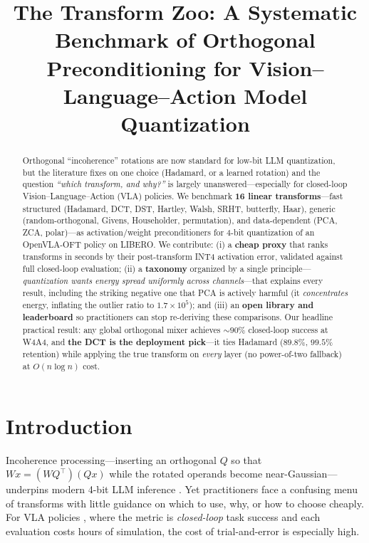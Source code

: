 \documentclass[conference]{IEEEtran}
\title{The Transform Zoo: A Systematic Benchmark of Orthogonal\\
Preconditioning for Vision--Language--Action Model Quantization}
\author{
\IEEEauthorblockN{Justin Williams, Kishor Datta Gupta, Roy George, Mrinmoy Sarkar}
\IEEEauthorblockA{Clark Atlanta University \quad \texttt{justinwilliamstech693@gmail.com}}
}
\begin{document}
\maketitle

\begin{abstract}
Orthogonal ``incoherence'' rotations are now standard for low-bit LLM quantization, but the
literature fixes on one choice (Hadamard, or a learned rotation) and the question
\emph{``which transform, and why?''} is largely unanswered---especially for closed-loop
Vision--Language--Action (VLA) policies. We benchmark \textbf{16 linear transforms}---fast
structured (Hadamard, DCT, DST, Hartley, Walsh, SRHT, butterfly, Haar), generic
(random-orthogonal, Givens, Householder, permutation), and data-dependent
(PCA, ZCA, polar)---as activation/weight preconditioners for 4-bit quantization of an
OpenVLA-OFT policy on LIBERO. We contribute: (i) a \textbf{cheap proxy} that ranks transforms
in seconds by their post-transform INT4 activation error, validated against full closed-loop
evaluation; (ii) a \textbf{taxonomy} organized by a single principle---\emph{quantization
wants energy spread uniformly across channels}---that explains every result, including the
striking negative one that PCA is actively harmful (it \emph{concentrates} energy, inflating
the outlier ratio to $1.7\times10^5$); and (iii) an \textbf{open library and leaderboard} so
practitioners can stop re-deriving these comparisons. Our headline practical result: any
global orthogonal mixer achieves $\sim\!90\%$ closed-loop success at W4A4, and \textbf{the DCT
is the deployment pick}---it ties Hadamard ($89.8\%$, $99.5\%$ retention) while applying the
true transform on \emph{every} layer (no power-of-two fallback) at $O(n\log n)$ cost.
\end{abstract}

\section{Introduction}
Incoherence processing---inserting an orthogonal $Q$ so that $Wx=(WQ^\top)(Qx)$ while the
rotated operands become near-Gaussian---underpins modern 4-bit LLM inference
\cite{quarot,spinquant,quip}. Yet practitioners face a confusing menu of transforms with
little guidance on which to use, why, or how to choose cheaply. For VLA policies
\cite{openvla,openvlaoft}, where the metric is \emph{closed-loop} task success and each
evaluation costs hours of simulation, the cost of trial-and-error is especially high.
\end{document}

